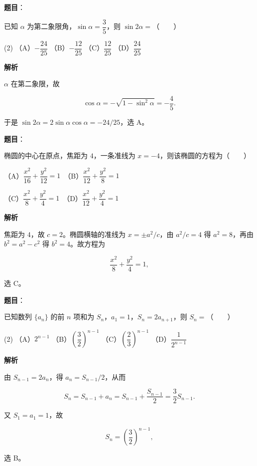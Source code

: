 \begin{answer}

\textbf{题目}：

已知 $\alpha$ 为第二象限角，$\sin\alpha=\dfrac35$，则 $\sin2\alpha=$\mbox{（　　）}

\begin{gkopts}(2)
\task （A）$-\dfrac{24}{25}$
\task （B）$-\dfrac{12}{25}$
\task （C）$\dfrac{12}{25}$
\task （D）$\dfrac{24}{25}$
\end{gkopts}

\textbf{解析}

$\alpha$ 在第二象限，故

\nopagebreak[4]
\[
\cos\alpha=-\sqrt{1-\sin^2\alpha}=-\frac45.
\]

于是 $\sin2\alpha=2\sin\alpha\cos\alpha=-24/25$，选 A。


\end{answer}
\begin{answer}

\textbf{题目}：

椭圆的中心在原点，焦距为 $4$，一条准线为 $x=-4$，则该椭圆的方程为\mbox{（　　）}

（A）$\dfrac{x^2}{16}+\dfrac{y^2}{12}=1$　（B）$\dfrac{x^2}{12}+\dfrac{y^2}{8}=1$

（C）$\dfrac{x^2}{8}+\dfrac{y^2}{4}=1$　（D）$\dfrac{x^2}{12}+\dfrac{y^2}{4}=1$

\textbf{解析}

焦距为 $4$，故 $c=2$。椭圆横轴的准线为 $x=\pm a^2/c$，由 $a^2/c=4$ 得 $a^2=8$，再由 $b^2=a^2-c^2$ 得 $b^2=4$。故方程为

\nopagebreak[4]
\[
\frac{x^2}{8}+\frac{y^2}{4}=1,
\]

选 C。


\end{answer}
\begin{answer}

\textbf{题目}：

已知数列 $\{a_n\}$ 的前 $n$ 项和为 $S_n$，$a_1=1$，$S_n=2a_{n+1}$，则 $S_n=$\mbox{（　　）}

\begin{gkopts}(2)
\task （A）$2^{n-1}$
\task （B）$\left(\dfrac32\right)^{n-1}$
\task （C）$\left(\dfrac23\right)^{n-1}$
\task （D）$\dfrac1{2^{n-1}}$
\end{gkopts}

\textbf{解析}

由 $S_{n-1}=2a_n$，得 $a_n=S_{n-1}/2$，从而

\nopagebreak[4]
\[
S_n=S_{n-1}+a_n
=S_{n-1}+\frac{S_{n-1}}2
=\frac32S_{n-1}.
\]

又 $S_1=a_1=1$，故

\nopagebreak[4]
\[
S_n=\left(\frac32\right)^{n-1},
\]

选 B。


\end{answer}
